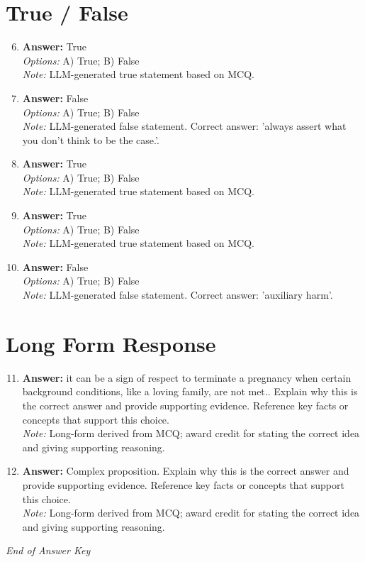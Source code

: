 \documentclass[12pt]{article}
\begin{document}
\section*{True / False}
\begin{enumerate}[label=\arabic*.]
\setcounter{enumi}{5}
\item \textbf{Answer:} True
\\ \textit{Options:} A) True; B) False
\\ \textit{Note:} LLM-generated true statement based on MCQ.
\item \textbf{Answer:} False
\\ \textit{Options:} A) True; B) False
\\ \textit{Note:} LLM-generated false statement. Correct answer: 'always assert what you don't think to be the case.'.
\item \textbf{Answer:} True
\\ \textit{Options:} A) True; B) False
\\ \textit{Note:} LLM-generated true statement based on MCQ.
\item \textbf{Answer:} True
\\ \textit{Options:} A) True; B) False
\\ \textit{Note:} LLM-generated true statement based on MCQ.
\item \textbf{Answer:} False
\\ \textit{Options:} A) True; B) False
\\ \textit{Note:} LLM-generated false statement. Correct answer: 'auxiliary harm'.
\end{enumerate}

\section*{Long Form Response}
\begin{enumerate}[label=\arabic*.]
\setcounter{enumi}{10}
\item \textbf{Answer:} it can be a sign of respect to terminate a pregnancy when certain background conditions, like a loving family, are not met.. Explain why this is the correct answer and provide supporting evidence. Reference key facts or concepts that support this choice.
\\ \textit{Note:} Long-form derived from MCQ; award credit for stating the correct idea and giving supporting reasoning.
\item \textbf{Answer:} Complex proposition. Explain why this is the correct answer and provide supporting evidence. Reference key facts or concepts that support this choice.
\\ \textit{Note:} Long-form derived from MCQ; award credit for stating the correct idea and giving supporting reasoning.
\end{enumerate}

\vfill
\noindent\textit{End of Answer Key}
\end{document}
